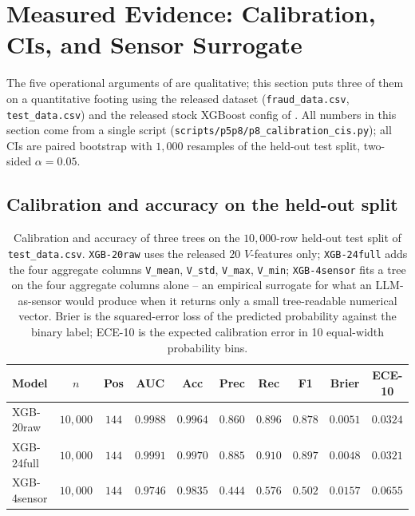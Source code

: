 \section{Measured Evidence: Calibration, CIs, and Sensor Surrogate}
\label{sec:p8-evidence}

The five operational arguments of  are
qualitative; this section puts three of them on a quantitative footing
using the released dataset (\texttt{fraud\_data.csv},
\texttt{test\_data.csv}) and the released stock XGBoost config of
. All numbers in this section come from a single
script (\texttt{scripts/p5p8/p8\_calibration\_cis.py}); all CIs are
paired bootstrap with $1{,}000$ resamples of the held-out test split,
two-sided $\alpha{=}0.05$.

\subsection{Calibration and accuracy on the held-out split}

\begin{table}[t]
\centering
\small
\caption{Calibration and accuracy of three trees on the $10{,}000$-row
held-out test split of \texttt{test\_data.csv}. \texttt{XGB-20raw} uses
the released $20$ $V$-features only; \texttt{XGB-24full} adds the four
aggregate columns \texttt{V\_mean}, \texttt{V\_std}, \texttt{V\_max},
\texttt{V\_min}; \texttt{XGB-4sensor} fits a tree on the four aggregate
columns alone -- an empirical surrogate for what an LLM-as-sensor would
produce when it returns only a small tree-readable numerical vector.
Brier is the squared-error loss of the predicted probability against
the binary label; ECE-10 is the expected calibration error in 10
equal-width probability bins.}
\label{tab:p8-evidence-cal}
\begin{tabular}{lccccccccc}
\toprule
Model & $n$ & Pos & AUC & Acc & Prec & Rec & F1 & Brier & ECE-10 \\
\midrule
XGB-20raw    & $10{,}000$ & $144$ & $0.9988$ & $0.9964$ & $0.860$ & $0.896$ & $0.878$ & $0.0051$ & $0.0324$ \\
XGB-24full   & $10{,}000$ & $144$ & $0.9991$ & $0.9970$ & $0.885$ & $0.910$ & $0.897$ & $0.0048$ & $0.0321$ \\
XGB-4sensor  & $10{,}000$ & $144$ & $0.9746$ & $0.9835$ & $0.444$ & $0.576$ & $0.502$ & $0.0157$ & $0.0655$ \\
\bottomrule
\end{tabular}
\end{table}


